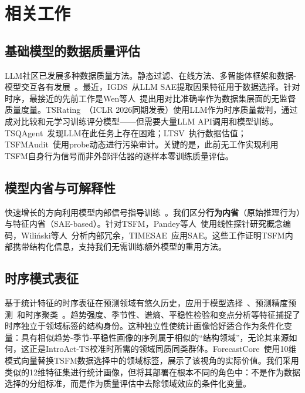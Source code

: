 \documentclass{article}
\begin{document}
\section{相关工作}

\subsection{基础模型的数据质量评估}

LLM社区已发展多种数据质量方法。静态过滤、在线方法、多智能体框架和数据-模型交互各有发展~\citep{penedo2024fineweb, yu2024mates, xie2023doremi, bai2025multi, liang2025dataflow, liang2026datacentric}。最近，IGDS~\citep{shi2026igds}从LLM SAE提取因果特征用于数据选择。针对时序，最接近的先前工作是Wen等人~\citep{wen2024measuring}提出用对比准确率作为数据集层面的无监督质量度量。TSRating~\citep{chen2026tsrating}（ICLR 2026同期发表）使用LLM作为时序质量裁判，通过成对比较和元学习训练评分模型——但需要大量LLM API调用和模型训练。TSQAgent~\citep{wu2026tsqagent}发现LLM在此任务上存在困难；LTSV~\citep{wu2025ltsv}执行数据估值；TSFMAudit~\citep{li2026tsfmaudit}使用probe动态进行污染审计。关键的是，此前无工作实现利用TSFM自身行为信号而非外部评估器的逐样本零训练质量评估。

\subsection{模型内省与可解释性}

快速增长的方向利用模型内部信号指导训练~\citep{shi2026igds, anthropic2026introspection}。我们区分\textbf{行为内省}（原始推理行为）与特征内省（SAE-based）。针对TSFM，Pandey等人~\citep{pandey2025internal}使用线性探针研究概念编码，Wili\'nski等人~\citep{wilinski2025exploring}分析内部冗余，TIMESAE~\citep{timesae2025}应用SAE。这些工作证明TSFM内部携带结构化信息，支持我们无需训练额外模型的重用方法。

\subsection{时序模式表征}

基于统计特征的时序表征在预测领域有悠久历史，应用于模型选择~\citep{wang2006characteristic}、预测精度预测~\citep{kang2017visual}和时序聚类~\citep{liao2005clustering}。趋势强度、季节性、谱熵、平稳性检验和变点分析等特征捕捉了时序独立于领域标签的结构身份。这种独立性使统计画像恰好适合作为条件化变量：具有相似趋势-季节-平稳性画像的序列属于相似的“结构领域”，无论其来源如何，这正是IntroAct-TS校准时所需的领域同质同类群体。ForecastCore~\citep{forecastcore2026}使用10维模式向量替换TSFM数据选择中的领域标签，展示了该视角的实际价值。我们采用类似的12维特征集进行统计画像，但将其部署在根本不同的角色中：不是作为数据选择的分组标准，而是作为质量评估中去除领域效应的条件化变量。
\end{document}
